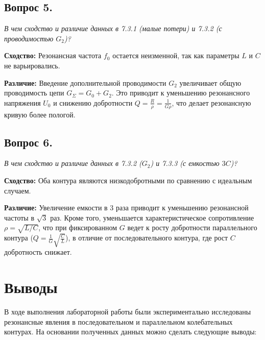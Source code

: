 \subsection*{Вопрос 5.}
\textit{В чем сходство и различие данных в 7.3.1 (малые потери) и 7.3.2 (с проводимостью $G_2$)?}

\textbf{Сходство:} Резонансная частота $f_0$ остается неизменной, так как параметры $L$ и $C$ не варьировались.

\textbf{Различие:} Введение дополнительной проводимости $G_2$ увеличивает общую проводимость цепи $G_{\Sigma} = G_0 + G_2$. Это приводит к уменьшению резонансного напряжения $U_0$ и снижению добротности $Q = \frac{R}{\rho} = \frac{1}{G\rho}$, что делает резонансную кривую более пологой.

\subsection*{Вопрос 6.}
\textit{В чем сходство и различие данных в 7.3.2 ($G_2$) и 7.3.3 (с емкостью $3C$)?}

\textbf{Сходство:} Оба контура являются низкодобротными по сравнению с идеальным случаем.

\textbf{Различие:} Увеличение емкости в 3 раза приводит к уменьшению резонансной частоты в $\sqrt{3}$ раз. Кроме того, уменьшается характеристическое сопротивление $\rho = \sqrt{L/C}$, что при фиксированном $G$ ведет к росту добротности параллельного контура ($Q = \frac{1}{G} \sqrt{\frac{C}{L}}$), в отличие от последовательного контура, где рост $C$ добротность снижает.


\section*{Выводы}

В ходе выполнения лабораторной работы были экспериментально исследованы резонансные явления в последовательном и параллельном колебательных контурах. На основании полученных данных можно сделать следующие выводы:

